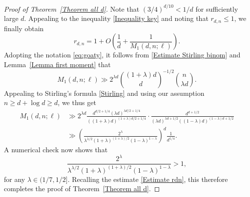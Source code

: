 \documentclass[11pt, reqno]{amsart}
\numberwithin{equation}{section}
\renewcommand{\leq}{\leqslant}
\renewcommand{\geq}{\geqslant}
\begin{document}
\begin{proof}[Proof of Theorem~\ref{Theorem all d}]
Note that 
$(3/4)^{d/10}<1/d$   for sufficiently large $d$.
Appealing to the inequality \eqref{Inequality key} and noting that $r_{d,n}\leq 1$,
 we finally obtain
\begin{equation}
\label{Estimate rdn}
r_{d,n} = 1 + O \left( \frac1{d} +\frac1{M_1(d,n;\ell)} \right).
\end{equation}
Adopting the notation \eqref{eq:goaty},  
it follows from \eqref{Estimate Stirling binom} and 
Lemma~\ref{Lemma first moment}  that
\begin{equation*}
M_1(d,n;\ell) \gg 2^{\lambda d} \binom{(1+\lambda)d}{d}^{-1/2} \binom{n}{\lambda d}.
\end{equation*}
Appealing to Stirling's formula \eqref{Stirling} and using our assumption $n \geq  d+\log d \geq d$, we thus get 
\begin{align*}
M_1(d,n;\ell) & \gg 2^{\lambda d} \frac{d^{d/2+1/4}(\lambda d)^{\lambda d/2+1/4}}{((1+\lambda)d)^{(1+\lambda)d/2+1/4}} \cdot \frac{d^{ d+1/2}}{(\lambda d)^{\lambda d+1/2} ((1-\lambda) d)^{(1-\lambda) d+1/2}} \\
& \gg \left( \frac{2^{\lambda} }{\lambda^{\lambda/2} (1+\lambda)^{(1+\lambda)/2} (1-\lambda)^{1-\lambda}} \right)^d \frac1{d^{1/4}}.
\end{align*}
A numerical check now shows that 
\begin{equation*}
\frac{2^{\lambda} }{\lambda^{\lambda/2} (1+\lambda)^{(1+\lambda)/2} (1-\lambda)^{1-\lambda}} > 1,
\end{equation*}
for any $\lambda \in (1/7, 1/2]$. 
Recalling the estimate \eqref{Estimate rdn}, this therefore  completes the proof of Theorem~\ref{Theorem all d}.
\end{proof}
\end{document}
